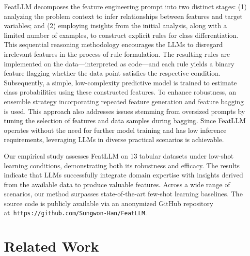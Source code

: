 \textsf{FeatLLM} decomposes the feature engineering prompt into two distinct stages: (1) analyzing the problem context to infer relationships between features and target variables; and (2) employing insights from the initial analysis, along with a limited number of examples, to construct explicit rules for class differentiation. This sequential reasoning methodology encourages the LLMs to disregard irrelevant features in the process of rule formulation. The resulting rules are implemented on the data—interpreted as code—and each rule yields a binary feature flagging whether the data point satisfies the respective condition. Subsequently, a simple, low-complexity predictive model is trained to estimate class probabilities using these constructed features. To enhance robustness, an ensemble strategy incorporating repeated feature generation and feature bagging is used. This approach also addresses issues stemming from oversized prompts by tuning the selection of features and data samples during bagging. Since \textsf{FeatLLM} operates without the need for further model training and has low inference requirements, leveraging LLMs in diverse practical scenarios is achievable.

Our empirical study assesses \textsf{FeatLLM} on 13 tabular datasets under low-shot learning conditions, demonstrating both its robustness and efficacy. The results indicate that LLMs successfully integrate domain expertise with insights derived from the available data to produce valuable features. Across a wide range of scenarios, our method surpasses state-of-the-art few-shot learning baselines. The source code is publicly available via an anonymized GitHub repository at~\texttt{https://github.com/Sungwon-Han/FeatLLM}.

\section{Related Work}

